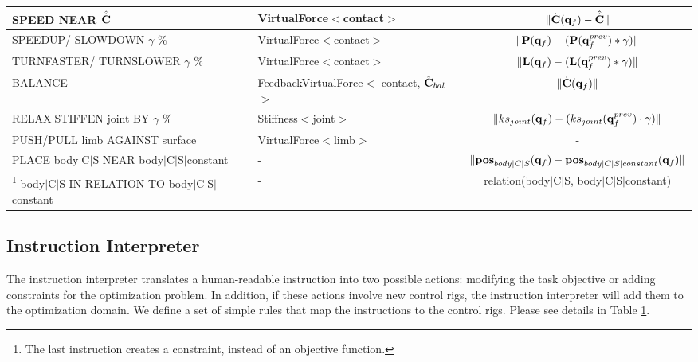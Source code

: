 \begin{table}[t]
\begin{minipage}{\textwidth}
\begin{tabular}{ | p{3.7cm} | p{3.7cm} | c |}
      SPEED NEAR $\hat{\dot{\mathbf{C}}}$ 
      & VirtualForce$<$contact$>$
      & $ \|\dot{\mathbf{C}}(\mathbf{q}_f) - \hat{\dot{\mathbf{C}}}\|$ \\ \hline

      SPEEDUP/ SLOWDOWN $\gamma$ \% 
      & VirtualForce$<$contact$>$
      & $ \|\mathbf{P}(\mathbf{q}_f) - (\mathbf{P}(\mathbf{q}^{prev}_f) * \gamma) \|$ \\ \hline

      TURNFASTER/ TURNSLOWER $\gamma$ \% 
      & VirtualForce$<$contact$>$
      & $ \|\mathbf{L}(\mathbf{q}_f) - (\mathbf{L}(\mathbf{q}^{prev}_f) * \gamma) \|$ \\ \hline

      BALANCE 
      & FeedbackVirtualForce$<$ contact, $\hat{\mathbf{C}}_{bal}$ $>$
      & $ \|\dot{\mathbf{C}}(\mathbf{q}_f)\|$ \\ \hline

      RELAX$|$STIFFEN joint BY $\gamma$ \% 
      & Stiffness$<$joint$>$
      & $ \|ks_{joint} (\mathbf{q}_f)- (ks_{joint}(\mathbf{q}^{prev}_f) \cdot \gamma) \|$ \\ \hline

      PUSH/PULL limb AGAINST surface 
      & VirtualForce$<$limb$>$
      & - \\ \hline

      PLACE body$|$C$|$S NEAR body$|$C$|$S$|$constant 
      & - 
      & $\|\mathbf{pos}_{body|C|S}(\mathbf{q}_f) - \mathbf{pos}_{body|C|S|constant}(\mathbf{q}_f)\|$ 
      \\ \hline

      \footnote{The last instruction creates a constraint, instead of an objective function. }
      body$|$C$|$S IN RELATION TO body$|$C$|$S$|$constant
      & - 
      &  relation(body$|$C$|$S, body$|$C$|$S$|$constant) \\ \hline
    \end{tabular}

    \label{tab:parkour_map}
  \end{minipage}
\end{table}


\subsection{Instruction Interpreter}
The instruction interpreter translates a human-readable instruction into two
possible actions: modifying the task objective or adding constraints for
the optimization problem. In addition, if these actions involve
new control rigs, the instruction interpreter will add them to the
optimization domain. We define a set of simple rules that map the
instructions to the control rigs. Please see details in Table \ref{tab:parkour_map}.

